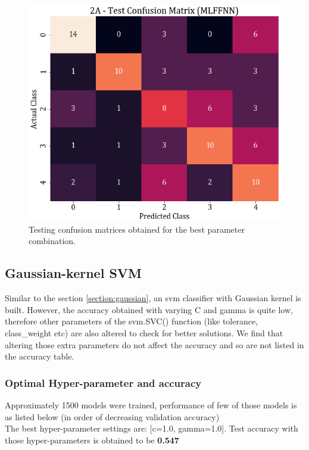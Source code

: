 \documentclass[11pt,a4paper]{article}
\begin{document}
\begin{figure}[H]
    \centering
    \includegraphics[scale=0.45]{images/2A_MLFFNN_test_confmat.png}
    \caption{Testing confusion matrices obtained for the best parameter combination.}
\end{figure}


\subsection{Gaussian-kernel SVM}
Similar to the section \ref{section:gaussian}, an svm classifier with Gaussian kernel is built. However, the accuracy obtained with varying C and gamma is quite low, therefore other parameters of the svm.SVC()  function (like tolerance, class\_weight etc) are also altered to check for better solutions. We find that altering those extra parameters do not affect the accuracy and so are not listed in the accuracy table.

\subsubsection{Optimal Hyper-parameter and accuracy}
Approximately 1500 models were trained, performance of few of those models is as listed below (in order of decreasing validation accuracy)\\


The best hyper-parameter settings are: [c=1.0, gamma=1.0]. Test accuracy with those hyper-parameters is obtained to be \textbf{0.547}
\end{document}

